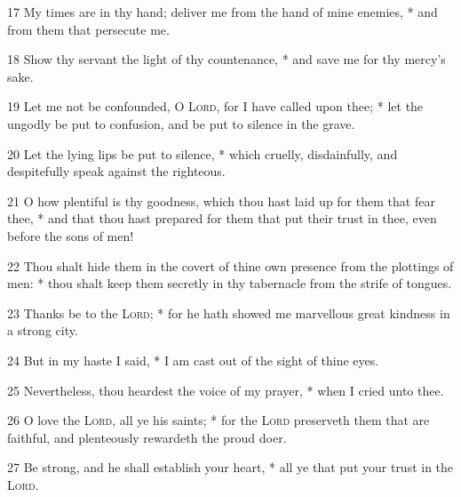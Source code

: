 17 My times are in thy hand; deliver me from the hand of mine enemies, * and from them that persecute me.\par
18 Show thy servant the light of thy countenance, * and save me for thy mercy's sake.\par
19 Let me not be confounded, O {\textsc{Lord}}, for I have called upon thee; * let the ungodly be put to confusion, and be put to silence in the grave.\par
20 Let the lying lips be put to silence, * which cruelly, disdainfully, and despitefully speak against the righteous.\par
21 O how plentiful is thy goodness, which thou hast laid up for them that fear thee, * and that thou hast prepared for them that put their trust in thee, even before the sons of men!\par
22 Thou shalt hide them in the covert of thine own presence from the plottings of men: * thou shalt keep them secretly in thy tabernacle from the strife of tongues.\par
23 Thanks be to the {\textsc{Lord}}; * for he hath showed me marvellous great kindness in a strong city.\par
24 But in my haste I said, * I am cast out of the sight of thine eyes.\par
25 Nevertheless, thou heardest the voice of my prayer, * when I cried unto thee.\par
26 O love the {\textsc{Lord}}, all ye his saints; * for the {\textsc{Lord}} preserveth them that are faithful, and plenteously rewardeth the proud doer.\par
27 Be strong, and he shall establish your heart, * all ye that put your trust in the {\textsc{Lord}}.
